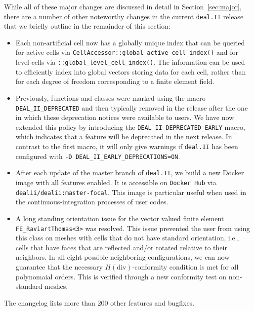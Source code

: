 \documentclass{ansarticle-preprint}
\newcommand{\specialword}[1]{\texttt{#1}}
\newcommand{\dealii}{{\specialword{deal.II}}\xspace}
\begin{document}
While all of these major changes are discussed in detail in
Section~\ref{sec:major}, there
are a number of other noteworthy changes in the current \dealii{} release
that we briefly outline in the remainder of this section:
%
\begin{itemize}
  \item Each non-artificial cell now has a globally unique index that can be queried
  for active cells via \texttt{CellAccessor::global\_active\_cell\_index()} and for level cells 
  via \texttt{::global\_\allowbreak level\_\allowbreak cell\_\allowbreak index()}. The information
  can be used to efficiently index into global vectors storing data
  for each cell, rather than for each degree of freedom corresponding to a finite
  element field.
  
  \item Previously, functions and classes were marked using the 
  macro \texttt{DEAL\_II\_DEPRECATED} and then typically removed in
  the release after the one in which these deprecation notices were
  available to users. We have now extended this policy by introducing
  the \texttt{DEAL\_II\_\allowbreak DEPRECATED\_EARLY} macro, which indicates that a feature will be
  deprecated in the next release. In contrast to the first macro, it will only give
  warnings if \dealii{} has been configured with \texttt{-D DEAL\_II\_EARLY\_DEPRECATIONS=ON}.

  \item After each update of the master branch of \dealii{}, we build a new Docker image
  with all features enabled. It is
  accessible on \texttt{Docker Hub} via \texttt{dealii/dealii:master-focal}. This image is
  particular useful when used in the continuous-integration processes of user codes.

  \item A long standing orientation issue for the vector valued finite
  element \texttt{FE\_RaviartThomas<3>} was resolved. This issue
  prevented the user from using this class on meshes with cells that
  do not have standard orientation, i.e., cells that have faces that
  are reflected and/or rotated relative to their neighbors. In all eight
  possible neighboring configurations, we can now guarantee that the
  necessary $H(\mathrm{div})$-conformity condition is met for all
  polynomaial orders. This is verified through a new conformity test
  on non-standard meshes.
\end{itemize}
%
The changelog lists more than 200 other features and bugfixes.
\end{document}
